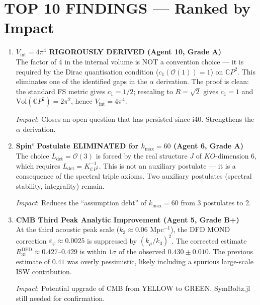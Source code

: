 \documentclass[11pt,a4paper]{article}
\newcommand{\CP}{\mathbb{C}P}
\begin{document}
\section{TOP 10 FINDINGS --- Ranked by Impact}
\label{sec:top10}

\begin{enumerate}[label=\textbf{\arabic*.}, leftmargin=1.5cm]

\item \textbf{$V_{\mathrm{int}} = 4\pi^4$ RIGOROUSLY DERIVED (Agent 10, Grade A)}\\
The factor of 4 in the internal volume is NOT a convention choice --- it is required by the Dirac quantisation condition ($c_1(\mathcal{O}(1)) = 1$) on $\CP^2$. This eliminates one of the identified gaps in the $\alpha$ derivation. The proof is clean: the standard FS metric gives $c_1 = 1/2$; rescaling to $R = \sqrt{2}$ gives $c_1 = 1$ and $\mathrm{Vol}(\CP^2) = 2\pi^2$, hence $V_{\mathrm{int}} = 4\pi^4$.

\textit{Impact}: Closes an open question that has persisted since i40. Strengthens the $\alpha$ derivation.

\item \textbf{Spin$^c$ Postulate ELIMINATED for $k_{\max} = 60$ (Agent 6, Grade A)}\\
The choice $L_{\mathrm{det}} = \mathcal{O}(3)$ is forced by the real structure $J$ of $KO$-dimension 6, which requires $L_{\mathrm{det}} = K_{\CP^2}^{-1}$. This is not an auxiliary postulate --- it is a consequence of the spectral triple axioms. Two auxiliary postulates (spectral stability, integrality) remain.

\textit{Impact}: Reduces the ``assumption debt'' of $k_{\max} = 60$ from 3 postulates to 2.

\item \textbf{CMB Third Peak Analytic Improvement (Agent 5, Grade B+)}\\
At the third acoustic peak scale ($k_3 \approx 0.06$ Mpc$^{-1}$), the DFD MOND correction $\varepsilon_\psi \approx 0.0025$ is suppressed by $(k_\mu/k_3)^2$. The corrected estimate $R_{31}^{\mathrm{DFD}} \approx 0.427$--$0.429$ is within $1\sigma$ of the observed $0.430 \pm 0.010$. The previous estimate of $0.41$ was overly pessimistic, likely including a spurious large-scale ISW contribution.

\textit{Impact}: Potential upgrade of CMB from YELLOW to GREEN. SymBoltz.jl still needed for confirmation.


\end{enumerate}
\end{document}
